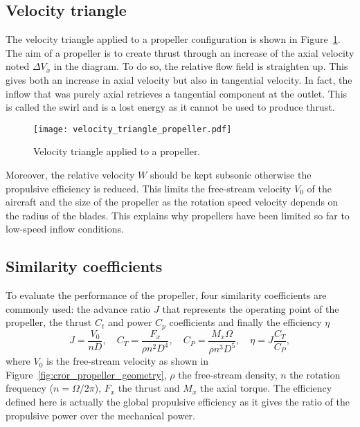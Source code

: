 \subsection{Velocity triangle}
\label{sub:cror_propeller_velocity_triangle}
The velocity triangle applied to a propeller configuration
is shown in Figure~\ref{fig:cror_velocity_triangle_propeller}.
The aim of a propeller is to create thrust through an increase
of the axial velocity noted $\Delta V_x$ in the diagram. To do
so, the relative flow field is straighten up. This gives both
an increase in axial velocity but also in tangential velocity.
In fact, the inflow that was purely axial retrieves a tangential
component at the outlet. This is called the swirl and
is a lost energy as it cannot be used to produce thrust.
\begin{figure}[htp]
  \centering
  \texttt{[image: velocity\_triangle\_propeller.pdf]}
  \caption{Velocity triangle applied to a propeller.}
  \label{fig:cror_velocity_triangle_propeller}
\end{figure}
Moreover, the relative velocity $W$ should be kept subsonic
otherwise the propulsive efficiency is reduced. This limits
the free-stream velocity $V_0$ of the aircraft and the size of 
the propeller as the rotation speed velocity depends on
the radius of the blades. This explains why propellers have
been limited so far to low-speed inflow conditions.

\subsection{Similarity coefficients}
\label{sub:similarity_coefficients}
To evaluate the performance of the propeller, four similarity
coefficients are commonly used:
the advance ratio $J$ that represents the operating point of the propeller,
the thrust $C_t$ and power $C_p$ coefficients and finally
the efficiency $\eta$
\begin{equation}
    J = \frac{V_0}{n D}, \quad
    C_T = \frac{F_x}{\rho n ^ 2  D ^ 4}, \quad
    C_P = \frac{M_x \Omega}{\rho n ^ 3 D ^ 5}, \quad
    \eta = J \frac{C_T}{C_P},
\end{equation}
where $V_0$ is the free-stream velocity 
as shown in Figure~\ref{fig:cror_propeller_geometry},
$\rho$ the free-stream density,
$n$ the rotation frequency ($n = \Omega / 2 \pi$),
$F_x$ the thrust and
$M_x$ the axial torque.
The efficiency defined here is actually the global propulsive efficiency
as it gives the ratio of the propulsive power over the mechanical power.

